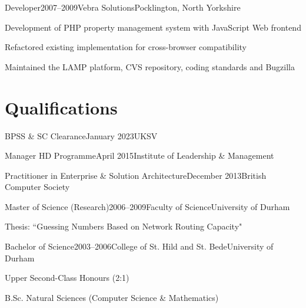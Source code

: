 \documentclass{cv}
\begin{document}

\begin{experience}{Developer}{2007--2009}{Vebra Solutions}{Pocklington, North Yorkshire}
\item Development of PHP property management system with JavaScript Web frontend
\item Refactored existing implementation for cross-browser compatibility
\item Maintained the LAMP platform, CVS repository, coding standards and Bugzilla
\end{experience}


\section{Qualifications}

\begin{experienceplain}{BPSS \& SC Clearance}{January 2023}{UKSV}{}
\end{experienceplain}

\begin{experienceplain}{Manager HD Programme}{April 2015}{Institute of Leadership \& Management}{}
\end{experienceplain}

\begin{experienceplain}{Practitioner in Enterprise \& Solution Architecture}{December 2013}{British Computer Society}{}
\end{experienceplain}

\begin{experience}{Master of Science (Research)}{2006--2009}{Faculty of Science}{University of Durham}
\item Thesis: ``Guessing Numbers Based on Network Routing Capacity"
\end{experience}

\begin{experience}{Bachelor of Science}{2003--2006}{College of St. Hild and St. Bede}{University of Durham}
\item Upper Second-Class Honours (2:1)
\item B.Sc. Natural Sciences (Computer Science \& Mathematics)
\end{experience}
\end{document}
